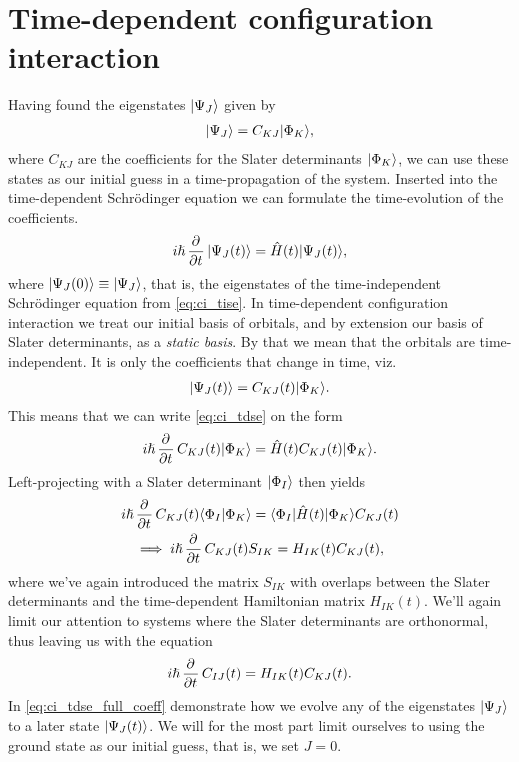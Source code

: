     \section{Time-dependent configuration interaction}
        Having found the eigenstates $| \Psi_J \rangle$ given by
        \begin{align}
            | \Psi_J \rangle = C_{KJ}| \Phi_K \rangle,
        \end{align}
        where $C_{KJ}$ are the coefficients for the Slater determinants
        $| \Phi_K \rangle$,
        we can use these states as our initial guess in a time-propagation of
        the system.
        Inserted into the time-dependent Schrödinger equation we can formulate
        the time-evolution of the coefficients.
        \begin{align}
            i\hslash \dpd[]{}{t}\ket{\Psi_J(t)}
            = \hamil(t)\ket{\Psi_J(t)},
            \label{eq:ci_tdse}
        \end{align}
        where $| \Psi_J(0) \rangle \equiv | \Psi_J \rangle$, that is, the eigenstates of
        the time-independent Schrödinger equation from \autoref{eq:ci_tise}.
        In time-dependent configuration interaction we treat our initial basis
        of orbitals, and by extension our basis of Slater determinants, as a
        \emph{static basis}.
        By that we mean that the orbitals are time-independent.
        It is only the coefficients that change in time, viz.
        \begin{align}
            | \Psi_J(t) \rangle = C_{KJ}(t)| \Phi_K \rangle.
        \end{align}
        This means that we can write \autoref{eq:ci_tdse} on the form
        \begin{align}
            i\hslash \dpd[]{}{t}C_{KJ}(t)\ket{\Phi_K}
            = \hamil(t) C_{KJ}(t)\ket{\Phi_K}.
        \end{align}
        Left-projecting with a Slater determinant $| \Phi_I \rangle$ then yields
        \begin{gather}
            i\hslash \dpd[]{}{t}C_{KJ}(t)\braket{\Phi_I}{\Phi_K}
            = \bra{\Phi_I}\hamil(t)\ket{\Phi_K} C_{KJ}(t) \\
            \implies
            i\hslash \dpd[]{}{t}C_{KJ}(t) S_{IK}
            = H_{IK}(t) C_{KJ}(t),
        \end{gather}
        where we've again introduced the matrix $S_{IK}$ with overlaps between
        the Slater determinants and the time-dependent Hamiltonian matrix
        $H_{IK}(t)$.
        We'll again limit our attention to systems where the Slater
        determinants are orthonormal, thus leaving us with the equation
        \begin{align}
            i\hslash \dpd[]{}{t}C_{IJ}(t)
            = H_{IK}(t) C_{KJ}(t).
            \label{eq:ci_tdse_full_coeff}
        \end{align}
        In \autoref{eq:ci_tdse_full_coeff} demonstrate how we evolve any of the
        eigenstates $| \Psi_J \rangle$ to a later state $| \Psi_J(t) \rangle$.
        We will for the most part limit ourselves to using the ground state as
        our initial guess, that is, we set $J = 0$.
